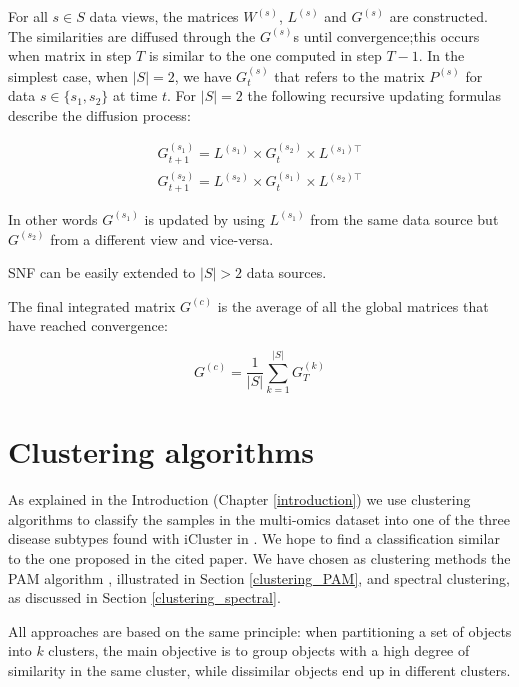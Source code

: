 For all $s\in S$ data views, the matrices $W^{(s)}$, $L^{(s)}$ and $G^{(s)}$ are constructed. The similarities are diffused through the $G^{(s)}$s until convergence;this occurs when matrix in step $T$ is similar to the one computed in step $T-1$.  
In the simplest case, when $|S|=2$, we have $G_t^{(s)}$ that refers to the matrix $P^{(s)}$ for data $s \in \{ s_1,s_2\}$ at time $t$.
For $|S|=2$ the following recursive updating formulas describe the diffusion process:

\begin{equation*}
    \begin{aligned}
        G^{(s_1)}_{t+1}=L^{(s_1)} \times G^{(s_2)}_{t} \times L^{(s_1)\top} \\
        G^{(s_2)}_{t+1}=L^{(s_2)} \times G^{(s_1)}_{t} \times L^{(s_2)\top}  
    \end{aligned}
\end{equation*}

In other words $G^{(s_1)}$ is updated by using $L^{(s_1)}$ from the same data source but $G^{(s_2)}$ from a different view and vice-versa.

SNF can be easily extended to $|S|>2$ data sources. \newline


The final integrated matrix $G^{(c)}$ is the average of all the global matrices that have reached convergence:

\begin{equation*}
    G^{(c)} = \frac{1}{|S|} \sum_{k=1}^{|S|} G_T^{(k)}
\end{equation*}


\section{Clustering algorithms}\label{methods_clustering}
As explained in the Introduction (Chapter \ref{introduction}) we use clustering algorithms to classify the samples in the multi-omics dataset into one of the three disease subtypes found with iCluster in \cite{shen2009integrative}. We hope to find a classification similar to the one proposed in the cited paper. We have chosen as clustering methods the PAM algorithm%
, illustrated in Section \ref{clustering_PAM}, and spectral clustering\cite{von2007SP}, as discussed in Section \ref{clustering_spectral}.

All approaches are based on the same principle: when partitioning a set of objects into $k$ clusters, the main objective is to group objects with a high degree of similarity in the same cluster, while dissimilar objects end up in different clusters.

